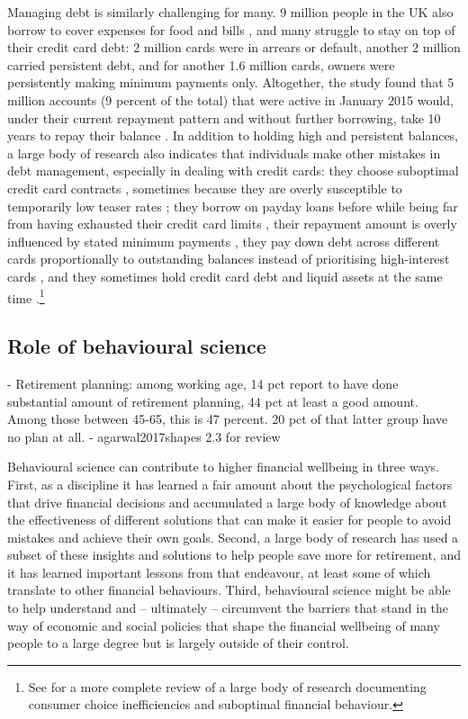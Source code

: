 Managing debt is similarly challenging for many. 9 million people in the UK
also borrow to cover expenses for food and bills \citep{mps2018building}, and
many struggle to stay on top of their credit card debt: 2 million cards were in
arrears or default, another 2 million carried persistent debt, and for another
1.6 million cards, owners were persistently making minimum payments only.
Altogether, the study found that 5 million accounts (9 percent of the total)
that were active in January 2015 would, under their current repayment pattern
and without further borrowing, take 10 years to repay their balance
\citep{fca2016credit}. In addition to holding high and persistent balances, a
large body of research also indicates that individuals make other mistakes in
debt management, especially in dealing with credit cards: they choose
suboptimal credit card contracts \citep{agarwal2015consumers}, sometimes
because they are overly susceptible to temporarily low teaser rates
\citep{shui2004time, ausubel1991failure}; they borrow on payday loans before
while being far from having exhausted their credit card limits
\citep{agarwal2009payday}, their repayment amount is overly influenced by
stated minimum payments \citep{sakaguchi2022default}, they pay down debt across
different cards proportionally to outstanding balances instead of prioritising
high-interest cards \citep{gathergood2019individuals}, and they sometimes hold
credit card debt and liquid assets at the same time \citep{gross2002liquidity,
    gathergood2020co}.\footnote{See \citet{agarwal2017shapes} for a more
    complete review of a large body of research documenting consumer choice
inefficiencies and suboptimal financial behaviour.} 


\subsection{Role of behavioural science}%
\label{sub:role_of_behavioural_science}

- Retirement planning: among working age, 14 pct report to have done
substantial amount of retirement planning, 44 pct at least a good amount. Among
those between 45-65, this is 47 percent. 20 pct of that latter group have no
plan at all. 
- agarwal2017shapes 2.3 for review

Behavioural science can contribute to higher financial wellbeing in three ways.
First, as a discipline it has learned a fair amount about the psychological
factors that drive financial decisions and accumulated a large body of
knowledge about the effectiveness of different solutions that can make it
easier for people to avoid mistakes and achieve their own goals. Second, a
large body of research has used a subset of these insights and solutions to
help people save more for retirement, and it has learned important lessons from
that endeavour, at least some of which translate to other financial behaviours.
Third, behavioural science might be able to help understand and -- ultimately
-- circumvent the barriers that stand in the way of economic and social
policies that shape the financial wellbeing of many people to a large degree
but is largely outside of their control.

